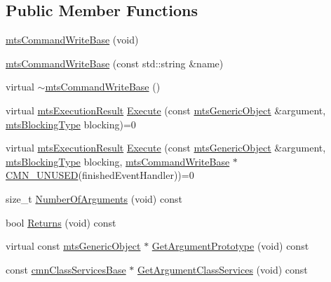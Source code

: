 \subsection*{Public Member Functions}
\begin{DoxyCompactItemize}
\item 
\hyperlink{classmts_command_write_base_a6f4d5fca6143636b3f0b55c99e1807fb}{mts\+Command\+Write\+Base} (void)
\item 
\hyperlink{classmts_command_write_base_a5a7579b6022d48ba89fff9d4a757258e}{mts\+Command\+Write\+Base} (const std\+::string \&name)
\item 
virtual \hyperlink{classmts_command_write_base_afc6522de71949aa9a17fbbfed1b739a8}{$\sim$mts\+Command\+Write\+Base} ()
\item 
virtual \hyperlink{classmts_execution_result}{mts\+Execution\+Result} \hyperlink{classmts_command_write_base_ae0f9db1cdc228fe67c59b86994d28115}{Execute} (const \hyperlink{classmts_generic_object}{mts\+Generic\+Object} \&argument, \hyperlink{mts_forward_declarations_8h_ad7426ccb6c883bc780d0ee197dddcbe7}{mts\+Blocking\+Type} blocking)=0
\item 
virtual \hyperlink{classmts_execution_result}{mts\+Execution\+Result} \hyperlink{classmts_command_write_base_a2bf3f188291d690478be5452ba5ba42d}{Execute} (const \hyperlink{classmts_generic_object}{mts\+Generic\+Object} \&argument, \hyperlink{mts_forward_declarations_8h_ad7426ccb6c883bc780d0ee197dddcbe7}{mts\+Blocking\+Type} blocking, \hyperlink{classmts_command_write_base}{mts\+Command\+Write\+Base} $\ast$\hyperlink{cmn_portability_8h_a021894e2626935fa2305434b1e893ff6}{C\+M\+N\+\_\+\+U\+N\+U\+S\+E\+D}(finished\+Event\+Handler))=0
\item 
size\+\_\+t \hyperlink{classmts_command_write_base_a0654ecf1e52106edaa961f4dd9ad8272}{Number\+Of\+Arguments} (void) const 
\item 
bool \hyperlink{classmts_command_write_base_a69c98178df30cf4b2c3bd808c3616402}{Returns} (void) const 
\item 
virtual const \hyperlink{classmts_generic_object}{mts\+Generic\+Object} $\ast$ \hyperlink{classmts_command_write_base_aeb23012177ead24850c6d2f5f9d76015}{Get\+Argument\+Prototype} (void) const 
\item 
const \hyperlink{classcmn_class_services_base}{cmn\+Class\+Services\+Base} $\ast$ \hyperlink{classmts_command_write_base_a95228eaf116fb4f55922f21ad47ea3a6}{Get\+Argument\+Class\+Services} (void) const 
\end{DoxyCompactItemize}
